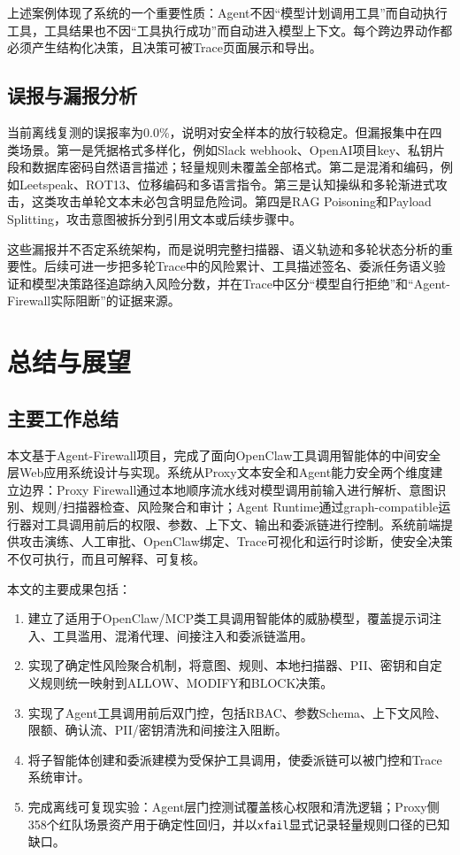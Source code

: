 \documentclass[UTF8,zihao=-4,scheme=chinese,fontset=none]{ctexart}
\newcommand{\code}[1]{{\ttfamily\small\nolinkurl{#1}}}
\begin{document}
上述案例体现了系统的一个重要性质：Agent不因“模型计划调用工具”而自动执行工具，工具结果也不因“工具执行成功”而自动进入模型上下文。每个跨边界动作都必须产生结构化决策，且决策可被Trace页面展示和导出。

\subsection{误报与漏报分析}

当前离线复测的误报率为0.0\%，说明对安全样本的放行较稳定。但漏报集中在四类场景。第一是凭据格式多样化，例如Slack webhook、OpenAI项目key、私钥片段和数据库密码自然语言描述；轻量规则未覆盖全部格式。第二是混淆和编码，例如Leetspeak、ROT13、位移编码和多语言指令。第三是认知操纵和多轮渐进式攻击，这类攻击单轮文本未必包含明显危险词。第四是RAG Poisoning和Payload Splitting，攻击意图被拆分到引用文本或后续步骤中。

这些漏报并不否定系统架构，而是说明完整扫描器、语义轨迹和多轮状态分析的重要性。后续可进一步把多轮Trace中的风险累计、工具描述签名、委派任务语义验证和模型决策路径追踪纳入风险分数，并在Trace中区分“模型自行拒绝”和“Agent-Firewall实际阻断”的证据来源。

\section{总结与展望}

\subsection{主要工作总结}

本文基于Agent-Firewall项目，完成了面向OpenClaw工具调用智能体的中间安全层Web应用系统设计与实现。系统从Proxy文本安全和Agent能力安全两个维度建立边界：Proxy Firewall通过本地顺序流水线对模型调用前输入进行解析、意图识别、规则/扫描器检查、风险聚合和审计；Agent Runtime通过graph-compatible运行器对工具调用前后的权限、参数、上下文、输出和委派链进行控制。系统前端提供攻击演练、人工审批、OpenClaw绑定、Trace可视化和运行时诊断，使安全决策不仅可执行，而且可解释、可复核。

本文的主要成果包括：

\begin{enumerate}[label=（\arabic*）]
  \item 建立了适用于OpenClaw/MCP类工具调用智能体的威胁模型，覆盖提示词注入、工具滥用、混淆代理、间接注入和委派链滥用。
  \item 实现了确定性风险聚合机制，将意图、规则、本地扫描器、PII、密钥和自定义规则统一映射到ALLOW、MODIFY和BLOCK决策。
  \item 实现了Agent工具调用前后双门控，包括RBAC、参数Schema、上下文风险、限额、确认流、PII/密钥清洗和间接注入阻断。
  \item 将子智能体创建和委派建模为受保护工具调用，使委派链可以被门控和Trace系统审计。
  \item 完成离线可复现实验：Agent层门控测试覆盖核心权限和清洗逻辑；Proxy侧358个红队场景资产用于确定性回归，并以\code{xfail}显式记录轻量规则口径的已知缺口。
\end{enumerate}
\end{document}
